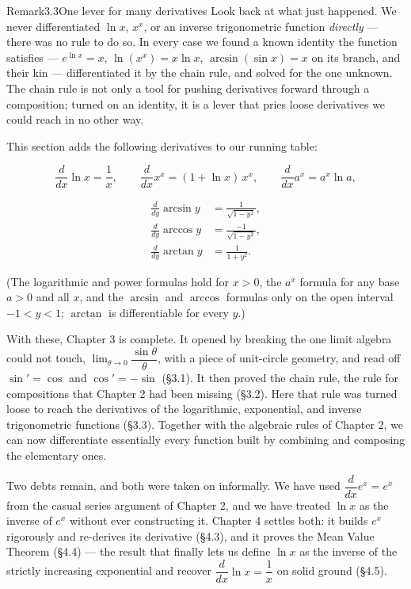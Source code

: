 \begin{hkremark}{Remark}{3.3}{One lever for many derivatives}
Look back at what just happened. We never differentiated \(\ln x\), \(x^{x}\), or an inverse trigonometric function \emph{directly} — there was no rule to do so. In every case we found a known identity the function satisfies — \(e^{\ln x} = x\), \(\ln(x^{x}) = x\ln x\), \(\arcsin(\sin x) = x\) on its branch, and their kin — differentiated it by the chain rule, and solved for the one unknown. The chain rule is not only a tool for pushing derivatives forward through a composition; turned on an identity, it is a lever that pries loose derivatives we could reach in no other way.
\end{hkremark}
This section adds the following derivatives to our running table:

\[ \frac{d}{dx}\ln x = \frac{1}{x}, \qquad \frac{d}{dx}x^{x} = (1 + \ln x)\,x^{x}, \qquad \frac{d}{dx}a^{x} = a^{x}\ln a, \]

\[ \begin{aligned}
    \frac{d}{dy}\arcsin y &= \frac{1}{\sqrt{1 - y^{2}}}, \\[2pt]
    \frac{d}{dy}\arccos y &= \frac{-1}{\sqrt{1 - y^{2}}}, \\[2pt]
    \frac{d}{dy}\arctan y &= \frac{1}{1 + y^{2}}.
  \end{aligned} \]

(The logarithmic and power formulas hold for \(x > 0\), the \(a^{x}\) formula for any base \(a > 0\) and all \(x\), and the \(\arcsin\) and \(\arccos\) formulas only on the open interval \(-1 < y < 1\); \(\arctan\) is differentiable for every \(y\).)

With these, Chapter 3 is complete. It opened by breaking the one limit algebra could not touch, \(\lim_{\theta \to 0}\dfrac{\sin\theta}{\theta}\), with a piece of unit-circle geometry, and read off \(\sin' = \cos\) and \(\cos' = -\sin\) (§3.1). It then proved the chain rule, the rule for compositions that Chapter 2 had been missing (§3.2). Here that rule was turned loose to reach the derivatives of the logarithmic, exponential, and inverse trigonometric functions (§3.3). Together with the algebraic rules of Chapter 2, we can now differentiate essentially every function built by combining and composing the elementary ones.

Two debts remain, and both were taken on informally. We have used \(\dfrac{d}{dx}e^{x} = e^{x}\) from the casual series argument of Chapter 2, and we have treated \(\ln x\) as the inverse of \(e^{x}\) without ever constructing it. Chapter 4 settles both: it builds \(e^{x}\) rigorously and re-derives its derivative (§4.3), and it proves the Mean Value Theorem (§4.4) — the result that finally lets us define \(\ln x\) as the inverse of the strictly increasing exponential and recover \(\dfrac{d}{dx}\ln x = \dfrac{1}{x}\) on solid ground (§4.5).
